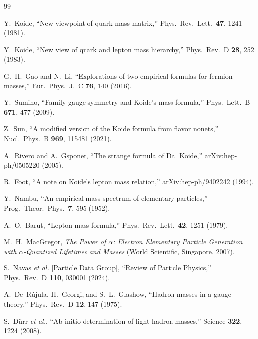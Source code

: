 \documentclass[11pt,a4paper]{article}
\begin{document}
\begin{thebibliography}{99}

  Y.~Koide,
  ``New viewpoint of quark mass matrix,''
  Phys.\ Rev.\ Lett.\ \textbf{47}, 1241 (1981).

  Y.~Koide,
  ``New view of quark and lepton mass hierarchy,''
  Phys.\ Rev.\ D \textbf{28}, 252 (1983).

  G.~H.~Gao and N.~Li,
  ``Explorations of two empirical formulas for fermion masses,''
  Eur.\ Phys.\ J.\ C \textbf{76}, 140 (2016).

  Y.~Sumino,
  ``Family gauge symmetry and Koide's mass formula,''
  Phys.\ Lett.\ B \textbf{671}, 477 (2009).

  Z.~Sun,
  ``A modified version of the Koide formula from flavor nonets,''
  Nucl.\ Phys.\ B \textbf{969}, 115481 (2021).

  A.~Rivero and A.~Gsponer,
  ``The strange formula of Dr.\ Koide,''
  arXiv:hep-ph/0505220 (2005).

  R.~Foot,
  ``A note on Koide's lepton mass relation,''
  arXiv:hep-ph/9402242 (1994).

  Y.~Nambu,
  ``An empirical mass spectrum of elementary particles,''
  Prog.\ Theor.\ Phys.\ \textbf{7}, 595 (1952).

  A.~O.~Barut,
  ``Lepton mass formula,''
  Phys.\ Rev.\ Lett.\ \textbf{42}, 1251 (1979).

  M.~H.~MacGregor,
  \textit{The Power of $\alpha$: Electron Elementary Particle
  Generation with $\alpha$-Quantized Lifetimes and Masses}
  (World Scientific, Singapore, 2007).

  S.~Navas \textit{et al.} [Particle Data Group],
  ``Review of Particle Physics,''
  Phys.\ Rev.\ D \textbf{110}, 030001 (2024).

  A.~De~R\'ujula, H.~Georgi, and S.~L.~Glashow,
  ``Hadron masses in a gauge theory,''
  Phys.\ Rev.\ D \textbf{12}, 147 (1975).

  S.~D\"urr \textit{et al.},
  ``Ab initio determination of light hadron masses,''
  Science \textbf{322}, 1224 (2008).


\end{thebibliography}
\end{document}
